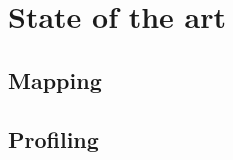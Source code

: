 \section{State of the art}
\label{sec:soa}
\subsection{Mapping}
\label{sec:soa-mapping}
\subsection{Profiling}
\label{sec:soa-profiling}
